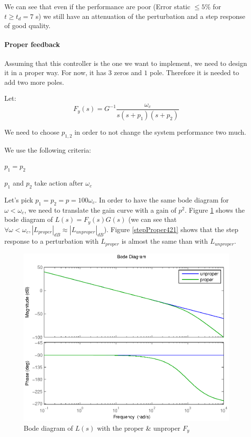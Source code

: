 We can see that even if the performance are poor (Error static $\leq 5\%$ for $t \geq t_d = 7$ s) we still have an attenuation of the perturbation and a step response of good quality.

\paragraph{Proper feedback}
Assuming that this controller is the one we want to implement, we need to design it in a proper way. For now, it has $3$ zeros and $1$ pole. Therefore it is needed to add two more poles.

Let:
$$F_y(s) = G^{-1}\frac{\omega_c}{s(s+p_1)(s+p_2)}$$

We need to choose $p_{1,2}$ in order to not change the system performance two much.

We use the following criteria:

\begin{shortitemize}
    \item $p_1 = p_2$
    \item $p_1$ and $p_2$ take action after $\omega_c$ 
\end{shortitemize}

Let's pick $p_1 = p_2 = p = 100\omega_c$. In order to have the same bode diagram for $\omega < \omega_c$, we need to translate the gain curve with a gain of $p^2$. Figure \ref{bodeProper421} shows the bode diagram of $L(s) = F_y(s) G(s)$ (we can see that $\forall \omega < \omega_c, |L_{proper}|_{dB} \approx |L_{unproper}|_{dB}$). Figure \ref{stepProper421} shows that the step response to a perturbation with $L_{proper}$ is almost the same than with $L_{unproper}$.

\begin{figure}[h!b]
    \includegraphics[width=\columnwidth]{fig/bodeProper421.eps}
    \caption{Bode diagram of $L(s)$ with the proper \& unproper $F_y$} 
    \label{bodeProper421}
\end{figure}

